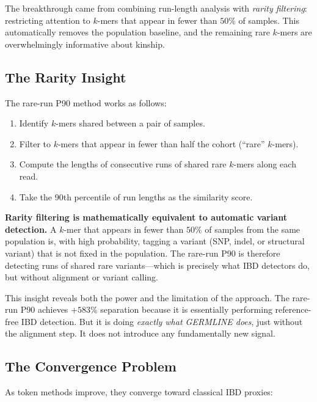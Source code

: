 \documentclass{../yalumba}
\begin{document}
The breakthrough came from combining run-length analysis with
\emph{rarity filtering}: restricting attention to $k$-mers that appear
in fewer than $50\%$ of samples.  This automatically removes the
population baseline, and the remaining rare $k$-mers are
overwhelmingly informative about kinship.

\subsection{The Rarity Insight}
\label{sec:trajectory:rarity}

The rare-run P90 method works as follows:

\begin{enumerate}
  \item Identify $k$-mers shared between a pair of samples.
  \item Filter to $k$-mers that appear in fewer than half the cohort
    (``rare'' $k$-mers).
  \item Compute the lengths of consecutive runs of shared rare $k$-mers
    along each read.
  \item Take the 90th percentile of run lengths as the similarity score.
\end{enumerate}

\begin{keyfinding}
\textbf{Rarity filtering is mathematically equivalent to automatic
variant detection.}  A $k$-mer that appears in fewer than $50\%$ of
samples from the same population is, with high probability, tagging a
variant (SNP, indel, or structural variant) that is not fixed in the
population.  The rare-run P90 is therefore detecting runs of shared
rare variants---which is precisely what IBD detectors do, but without
alignment or variant calling.
\end{keyfinding}

This insight reveals both the power and the limitation of the
approach.  The rare-run P90 achieves $+583\%$ separation because it is
essentially performing reference-free IBD detection.  But it is doing
\emph{exactly what GERMLINE does}, just without the alignment step.
It does not introduce any fundamentally new signal.

\subsection{The Convergence Problem}
\label{sec:trajectory:convergence}

As token methods improve, they converge toward classical IBD proxies:
\end{document}
